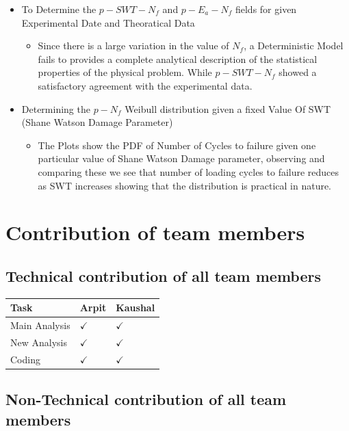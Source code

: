 \documentclass[11pt]{article}
\providecommand{\tightlist}{%
      \setlength{\itemsep}{0pt}\setlength{\parskip}{0pt}}
\begin{document}
\begin{itemize}
\tightlist
\item
  To Determine the \(p-SWT-N_f\) and \(p-E_a-N_f\) fields for given
  Experimental Date and Theoratical Data

  \begin{itemize}
  \tightlist
  \item
    Since there is a large variation in the value of \(N_f\), a
    Deterministic Model fails to provides a complete analytical
    description of the statistical properties of the physical problem.
    While \(p-SWT-N_f\) showed a satisfactory agreement with the
    experimental data.
  \end{itemize}
\item
  Determining the \(p-N_f\) Weibull distribution given a fixed Value Of
  SWT (Shane Watson Damage Parameter)

  \begin{itemize}
  \tightlist
  \item
    The Plots show the PDF of Number of Cycles to failure given one
    particular value of Shane Watson Damage parameter, observing and
    comparing these we see that number of loading cycles to failure
    reduces as SWT increases showing that the distribution is practical
    in nature.
  \end{itemize}
\end{itemize}

\hypertarget{contribution-of-team-members}{%
\section{Contribution of team
members}\label{contribution-of-team-members}}

\hypertarget{technical-contribution-of-all-team-members}{%
\subsection{Technical contribution of all team
members}\label{technical-contribution-of-all-team-members}}

\begin{longtable}[]{@{}lll@{}}
\toprule
Task & Arpit & Kaushal\tabularnewline
\midrule
\endhead
Main Analysis & \(\checkmark\) & \(\checkmark\)\tabularnewline
New Analysis & \(\checkmark\) & \(\checkmark\)\tabularnewline
Coding & \(\checkmark\) & \(\checkmark\)\tabularnewline
\bottomrule
\end{longtable}

\hypertarget{non-technical-contribution-of-all-team-members}{%
\subsection{Non-Technical contribution of all team
members}\label{non-technical-contribution-of-all-team-members}}
\end{document}
